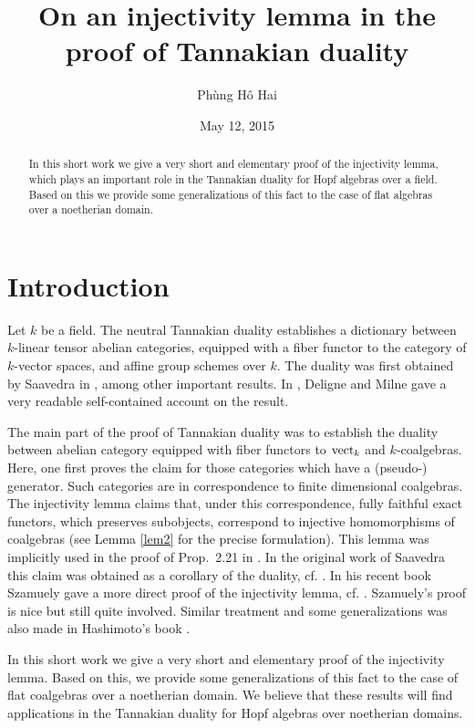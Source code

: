 \documentclass[12pt]{amsart}
\date{\datum}
\author{Ph\`ung H\^o Hai}\title{On an injectivity lemma in the proof of Tannakian duality}
\date{May 12, 2015}
\theoremstyle{plain}
\theoremstyle{definition}
\numberwithin{thm}{section}
\begin{document}
\begin{abstract}
In this short work we give a very short and 
elementary proof of the injectivity lemma, 
which plays an important role in the Tannakian duality for Hopf 
algebras over a field. Based on this we provide some generalizations of this fact to the case of flat algebras over a noetherian domain. 
\end{abstract} 
\maketitle  
\parskip10pt
\section*{Introduction}
Let $k$ be a field.
The neutral Tannakian duality establishes a 
dictionary between $k$-linear tensor abelian 
categories, equipped with a fiber functor to the 
category of $k$-vector spaces, and affine group 
schemes over $k$. The duality was first obtained 
by Saavedra in \cite{SR72},
among other important results. In \cite{DM}, 
Deligne and Milne gave a very readable 
self-contained account on the result. 

The main part of the proof of Tannakian duality 
was to establish the duality between abelian 
category equipped with fiber functors to ${\rm 
vect}_k$ and $k$-coalgebras. Here, one first 
proves the claim for those categories which have 
a (pseudo-) generator. Such categories are in correspondence to finite 
dimensional coalgebras. 
The injectivity lemma 
claims that, under this correspondence, fully 
faithful exact functors, which preserves 
subobjects, correspond to injective 
homomorphisms of coalgebras (see Lemma 
\ref{lem2} for the precise formulation). This lemma was implicitly used in the proof of Prop.~2.21 in \cite{DM}. 
In the original work of Saavedra  this claim was 
obtained as a corollary of the duality, cf. 
\cite[2.6.3~(f)]{SR72}. In his recent book 
Szamuely gave a more direct proof of the 
injectivity lemma, cf. \cite[Prop.~6.4.4]{Sza}. 
Szamuely's proof is nice but still quite 
involved. Similar treatment and some generalizations was also made in Hashimoto's book \cite[Lem.~3.6.10]{Ha}.

In this short work we give a very short and 
elementary proof of the injectivity lemma. Based on this, we provide some 
generalizations of this fact to the case of flat 
coalgebras over a noetherian domain. We believe that these results
will find applications in the Tannakian duality for Hopf algebras
over noetherian domains.
\end{document}
